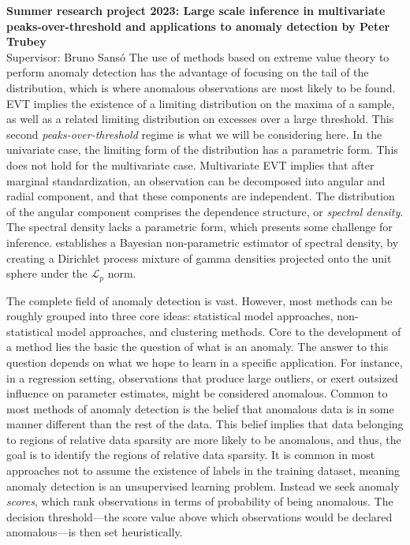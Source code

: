 \documentclass{article}
\begin{document}
{\Large \bf Summer research project 2023: Large scale inference in multivariate peaks-over-threshold 
and applications to anomaly detection by Peter Trubey}\\
\vskip 0.15cm
Supervisor: Bruno Sans\'{o}
\vskip 1cm
\nobibliography*
The use of methods based on extreme value theory to perform anomaly detection
    has the advantage of focusing on the tail of the distribution, which is where
    anomalous observations are most likely to be found.  EVT implies
    the existence of a limiting distribution on the maxima of a sample, as well
    as a related limiting distribution on excesses over a large threshold.  This
    second \emph{peaks-over-threshold} regime is what we will be considering here.
    In the univariate case, the limiting form of the distribution has a 
    parametric form.  This does not hold for the multivariate case.  Multivariate
    EVT implies that after marginal standardization, an observation can be decomposed
    into angular and radial component, and that these components are independent.
    The distribution of the angular component comprises the dependence structure, or
    \emph{spectral density}.  The spectral density lacks a parametric form, which
    presents some challenge for inference. \cite{trubey:pg} establishes a Bayesian
    non-parametric estimator of spectral density, by creating a Dirichlet process mixture
    of gamma densities projected onto the unit sphere under the $\mathcal{L}_p$ norm.

The complete field of anomaly detection is vast.  However, most methods can be 
    roughly grouped into three core ideas: statistical model approaches, 
    non-statistical model approaches, and clustering methods. Core to the 
    development of a method lies the basic the question of what is an anomaly.  
    The answer to this question depends on what we hope to
    learn in a specific application.  For instance, in a regression setting, 
    observations that produce large outliers, or exert outsized influence on parameter 
    estimates, might be considered anomalous.  Common to most 
    methods of anomaly detection is the belief that anomalous data is in some 
    manner different than the rest of the data. This belief implies that data 
    belonging to regions of relative data sparsity are more likely to be 
    anomalous, and thus, the goal is to identify the regions of relative 
    data sparsity. It is common in most approaches not to assume the existence of 
    labels in the training dataset, meaning anomaly detection is an unsupervised learning
    problem.  Instead we seek anomaly \emph{scores}, which rank observations in terms of
    probability of being anomalous.  The decision threshold---the score value above which
    observations would be declared anomalous---is then set heuristically.
    
\end{document}

